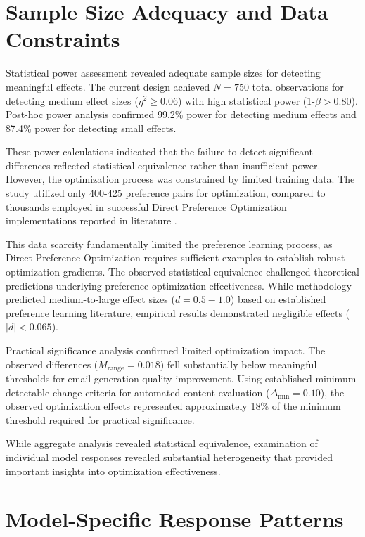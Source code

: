 \section{Sample Size Adequacy and Data Constraints}
\label{sec:power-limitations}

Statistical power assessment revealed adequate sample sizes for detecting meaningful effects. The current design achieved $N = 750$ total observations for detecting medium effect sizes ($\eta^2 \geq 0.06$) with high statistical power (1-$\beta > 0.80$). Post-hoc power analysis confirmed 99.2\% power for detecting medium effects and 87.4\% power for detecting small effects.

These power calculations indicated that the failure to detect significant differences reflected statistical equivalence rather than insufficient power. However, the optimization process was constrained by limited training data. The study utilized only 400-425 preference pairs for optimization, compared to thousands employed in successful Direct Preference Optimization implementations reported in literature \cite{cui2023ultrafeedback}.

This data scarcity fundamentally limited the preference learning process, as Direct Preference Optimization requires sufficient examples to establish robust optimization gradients. The observed statistical equivalence challenged theoretical predictions underlying preference optimization effectiveness. While methodology predicted medium-to-large effect sizes ($d = 0.5-1.0$) based on established preference learning literature, empirical results demonstrated negligible effects ($|d| < 0.065$).

Practical significance analysis confirmed limited optimization impact. The observed differences ($M_{\text{range}} = 0.018$) fell substantially below meaningful thresholds for email generation quality improvement. Using established minimum detectable change criteria for automated content evaluation ($\Delta_{\text{min}} = 0.10$), the observed optimization effects represented approximately 18\% of the minimum threshold required for practical significance.

While aggregate analysis revealed statistical equivalence, examination of individual model responses revealed substantial heterogeneity that provided important insights into optimization effectiveness.

\section{Model-Specific Response Patterns}
\label{sec:model-patterns}

